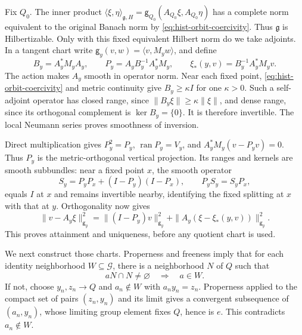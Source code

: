Fix \(Q_0\). The inner product
\(\langle\xi,\eta\rangle_{\mathfrak g,H}
=\mathsf g_{Q_0}(A_{Q_0}\xi,A_{Q_0}\eta)\) has a complete norm equivalent
to the original Banach norm by \eqref{eq:hist-orbit-coercivity}.
Thus \(\mathfrak g\) is Hilbertizable. Only with this fixed equivalent
Hilbert norm do we take adjoints. In a tangent chart write
\(\mathsf g_y(v,w)=\langle v,M_yw\rangle\), and define
\begin{equation}
B_y=A_y^*M_yA_y,
\qquad
P_y=A_yB_y^{-1}A_y^*M_y,
\qquad
\xi_*(y,v)=B_y^{-1}A_y^*M_yv.
\label{eq:hist-smooth-orbit-projection}
\end{equation}
The action makes \(A_y\) smooth in operator norm. Near each fixed point,
\eqref{eq:hist-orbit-coercivity} and metric continuity give
\(B_y\geq\kappa I\) for one \(\kappa>0\). Such a self-adjoint operator has
closed range, since \(\|B_y\xi\|\geq\kappa\|\xi\|\), and dense range,
since its orthogonal complement is \(\ker B_y=\{0\}\). It is therefore
invertible. The local Neumann series proves smoothness of inversion.

Direct multiplication gives \(P_y^2=P_y\),
\(\operatorname{ran}P_y=V_y\), and
\(A_y^*M_y(v-P_yv)=0\). Thus \(P_y\) is the metric-orthogonal vertical
projection. Its ranges and kernels are smooth subbundles: near a fixed
point \(x\), the smooth operator
\begin{equation}
S_y=P_yP_x+(I-P_y)(I-P_x),
\qquad
P_yS_y=S_yP_x,
\label{eq:hist-projection-trivialization}
\end{equation}
equals \(I\) at \(x\) and remains invertible nearby, identifying the fixed
splitting at \(x\) with that at \(y\). Orthogonality now gives
\begin{equation}
\|v-A_y\xi\|_{\mathsf g_y}^2
=\|(I-P_y)v\|_{\mathsf g_y}^2
+\|A_y(\xi-\xi_*(y,v))\|_{\mathsf g_y}^2.
\label{eq:hist-quotient-pythagoras}
\end{equation}
This proves attainment and uniqueness, before any quotient chart is used.

We next construct those charts. Properness and freeness imply that for each
identity neighborhood \(W\subseteq\mathcal G\), there is a neighborhood
\(N\) of \(Q\) such that
\begin{equation}
aN\cap N\ne\varnothing\quad\Longrightarrow\quad a\in W.
\label{eq:hist-proper-local-return}
\end{equation}
If not, choose \(y_n,z_n\to Q\) and \(a_n\notin W\) with
\(a_ny_n=z_n\). Properness applied to the compact set of pairs
\((z_n,y_n)\) and its limit gives a convergent subsequence of
\((a_n,y_n)\), whose limiting group element fixes \(Q\), hence is \(e\).
This contradicts \(a_n\notin W\).

